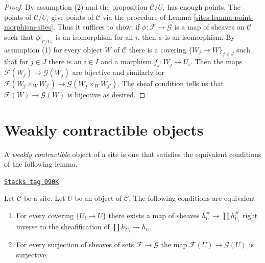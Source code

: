 \begin{proof}

By assumption (2) and the proposition $\mathcal{C}/U_i$ has enough points.
The points of $\mathcal{C}/U_i$ give points of $\mathcal{C}$
via the procedure of Lemma \ref{sites-lemma-point-morphism-sites}.
Thus it suffices to show: if $\phi : \mathcal{F} \to \mathcal{G}$
is a map of sheaves on $\mathcal{C}$ such that $\phi|_{\mathcal{C}/U_i}$
is an isomorphism for all $i$, then $\phi$ is an isomorphism.
By assumption (1) for every object $W$ of $\mathcal{C}$
there is a covering $\{W_j \to W\}_{j \in J}$
such that for $j \in J$ there is an $i \in I$ and a morphism
$f_j : W_j \to U_i$. Then the maps
$\mathcal{F}(W_j) \to \mathcal{G}(W_j)$
are bijective and similarly for
$\mathcal{F}(W_j \times_W W_{j'}) \to \mathcal{G}(W_j \times_W W_{j'})$.
The sheaf condition tells us that $\mathcal{F}(W) \to \mathcal{G}(W)$
is bijective as desired.
\end{proof}

\section{Weakly contractible objects}
\label{sites-section-w-contractible}
A {\it weakly contractible} object of a site is one that satisfies
the equivalent conditions of the following lemma.

\begin{lemma}[W contractible]
\label{sites-lemma-w-contractible}
\href{https://stacks.math.columbia.edu/tag/090K}{\texttt{Stacks tag 090K}}

Let $\mathcal{C}$ be a site. Let $U$ be an object of $\mathcal{C}$.
The following conditions are equivalent
\begin{enumerate}
\item For every covering $\{U_i \to U\}$ there exists a map of
sheaves $h_U^\# \to \coprod h_{U_i}^\#$ right inverse to the sheafification
of $\coprod h_{U_i} \to h_U$.
\item For every surjection of sheaves of sets $\mathcal{F} \to \mathcal{G}$
the map $\mathcal{F}(U) \to \mathcal{G}(U)$ is surjective.
\end{enumerate}
\end{lemma}

